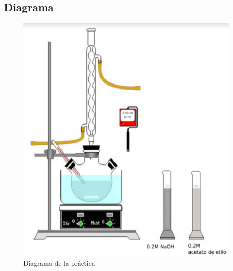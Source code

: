     \subsection{Diagrama}
        \begin{figure}[H]
            \centering
            \includegraphics[scale=0.7]{Figuras/Diagrama.eps}
            \caption{Diagrama de la práctica}
        \end{figure}
%
%
%